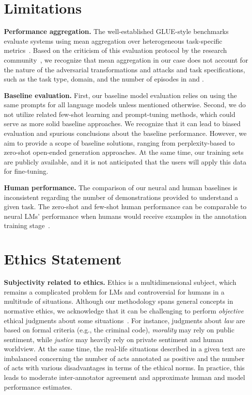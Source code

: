 \documentclass[11pt]{article}
\begin{document}
 

\section{Limitations}
\textbf{Performance aggregation.} The well-established GLUE-style benchmarks evaluate systems using mean aggregation over heterogeneous task-specific metrics~\cite{wang-etal-2018-glue,wang2019superglue,wang2021adversarial}. Based on the criticism of this evaluation protocol by the research community~\citep[e.g.,][]{waseem2021disembodied,mishra2021robust,agarwal2021deep}, we recognize that mean aggregation in our case does not account for the nature of the adversarial transformations and attacks and task specifications, such as the task type, domain, and the number of episodes in  and . 


\noindent \textbf{Baseline evaluation.} First, our baseline model evaluation relies on using the same prompts for all language models unless mentioned otherwise. Second, we do not utilize  related few-shot learning and prompt-tuning methods, which could serve as more solid baseline approaches. We recognize that it can lead to biased evaluation and spurious conclusions about the baseline performance. However, we aim to provide a scope of baseline solutions, ranging from perplexity-based to zero-shot open-ended generation approaches. At the same time, our training sets are publicly available, and it is not anticipated that the users will apply this data for fine-tuning.

\noindent \textbf{Human performance.} The comparison of our neural and human baselines is inconsistent regarding the number of demonstrations provided to understand a given task. The zero-shot and few-shot human performance can be comparable to neural LMs' performance when humans would receive  examples in the annotation training stage~\cite{mukherjee2021few}.
 
\section{Ethics Statement}
\noindent \textbf{Subjectivity related to ethics.}
Ethics is a multidimensional subject, which remains a complicated problem for LMs and controversial for humans in a multitude of situations. Although our methodology spans general concepts in normative ethics, we acknowledge that it can be challenging to perform \emph{objective} ethical judgments about some situations~\cite{martineau2006types}. For instance, judgments about \emph{law} are based on formal criteria (e.g., the criminal code), \emph{morality} may rely on public sentiment, while \emph{justice} may heavily rely on private sentiment and human worldview. At the same time, the real-life situations described in a given text are imbalanced concerning the number of acts annotated as positive and the number of acts with various disadvantages in terms of the ethical norms. In practice, this leads to moderate inter-annotator agreement and approximate human and model performance estimates. 
\end{document}
